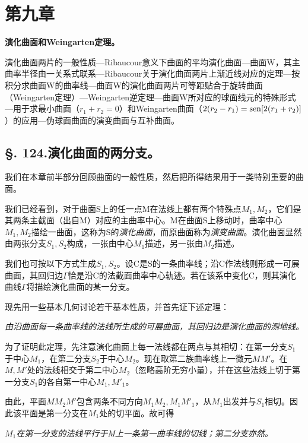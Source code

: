 \section*{第九章}
\begin{center}
{\Large\bfseries 演化曲面和Weingarten定理。}
\end{center}

\noindent 演化曲面两片的一般性质---Ribaucour意义下曲面的平均演化曲面---曲面W，其主曲率半径由一关系式联系---Ribaucour关于演化曲面两片上渐近线对应的定理---按积分求曲面W的曲率线---曲面W的演化曲面两片可等距贴合于旋转曲面（Weingarten定理）---Weingarten逆定理---曲面W所对应的球面线元的特殊形式---用于求最小曲面（\(r_1+r_2=0\)）和Weingarten曲面（\(2(r_2-r_1)=\operatorname{sen}[2(r_1+r_2)]\)）的应用---伪球面曲面的演变曲面与互补曲面。

\subsection*{\S. 124.\quad 演化曲面的两分支。}

我们在本章前半部分回顾曲面的一般性质，然后把所得结果用于一类特别重要的曲面。

我们已经看到，对于曲面S上的任一点M在法线上都有两个特殊点\(M_1,M_2\)，它们是其两条主截面（出自M）对应的主曲率中心。M在曲面S上移动时，曲率中心\(M_1,M_2\)描绘一曲面，这称为S的\emph{演化曲面}，而原曲面称为\emph{演变曲面}。演化曲面显然由两张分支\(S_1,S_2\)构成，一张由中心\(M_1\)描述，另一张由\(M_2\)描述。

我们也可按以下方式生成\(S_1,S_2\)。设C是S的一条曲率线；沿C作法线则形成一可展曲面，其回归边\(\Gamma\)恰是沿C的法截面曲率中心轨迹。若在该系中变化C，则其演化曲线\(\Gamma\)将描绘演化曲面的某一分支。

现先用一些基本几何讨论若干基本性质，并首先证下述定理：

\emph{由沿曲面每一条曲率线的法线所生成的可展曲面，其回归边是演化曲面的测地线。}

为了证明此定理，先注意演化曲面上每一法线都在两点与其相切：在第一分支\(S_1\)于中心\(M_1\)，在第二分支\(S_2\)于中心\(M_2\)。现在取第二族曲率线上一微元\(MM'\)。在\(M,M'\)处的法线相交于第二中心\(M_2\)（忽略高阶无穷小量），并在这些法线上切于第一分支\(S_1\)的各自第一中心\(M_1,M'_1\)。

由此，平面\(MM_2M'\)包含两条不同方向\(M_1M_2,M_1M'_1\)，从\(M_1\)出发并与\(S_1\)相切。因此该平面是第一分支在\(M_1\)处的切平面。故可得

\emph{\(M_1\)在第一分支的法线平行于M上一条第一曲率线的切线；第二分支亦然。}

